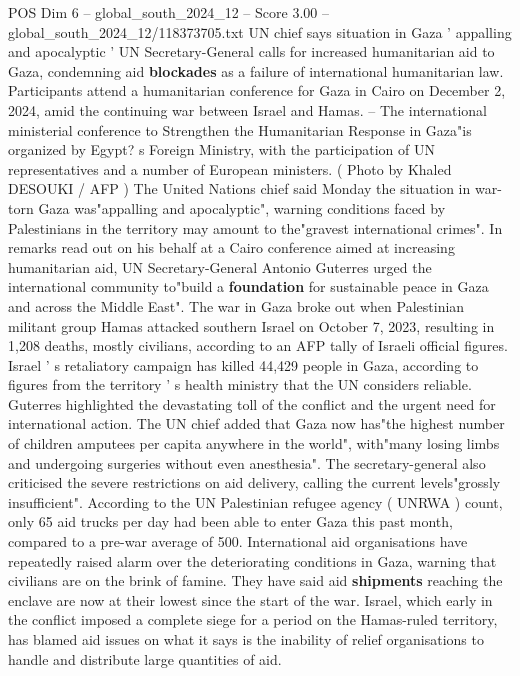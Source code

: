 \begin{textsample}{POS Dim 6 – global\_south\_2024\_12 – Score 3.00 – global\_south\_2024\_12/118373705.txt}  \label{ex:f6_pos_435}
UN chief says situation in Gaza ' appalling and apocalyptic ' UN Secretary-General calls for increased humanitarian aid to Gaza, condemning aid \textbf{blockades} as a failure of international humanitarian law.
Participants attend a humanitarian conference for Gaza in Cairo on December 2, 2024, amid the continuing war between Israel and Hamas. -- The international ministerial conference to Strengthen the Humanitarian Response in Gaza"is organized by Egypt? s Foreign Ministry, with the participation of UN representatives and a number of European ministers. ( Photo by Khaled DESOUKI / AFP ) The United Nations chief said Monday the situation in war-torn Gaza was"appalling and apocalyptic", warning conditions faced by Palestinians in the territory may amount to the"gravest international crimes".
In remarks read out on his behalf at a Cairo conference aimed at increasing humanitarian aid, UN Secretary-General Antonio Guterres urged the international community to"build a \textbf{foundation} for sustainable peace in Gaza and across the Middle East".
The war in Gaza broke out when Palestinian militant group Hamas attacked southern Israel on October 7, 2023, resulting in 1,208 deaths, mostly civilians, according to an AFP tally of Israeli official figures.
Israel ' s retaliatory campaign has killed 44,429 people in Gaza, according to figures from the territory ' s health ministry that the UN considers reliable.
Guterres highlighted the devastating toll of the conflict and the urgent need for international action.
The UN chief added that Gaza now has"the highest number of children amputees per capita anywhere in the world", with"many losing limbs and undergoing surgeries without even anesthesia".
The secretary-general also criticised the severe restrictions on aid delivery, calling the current levels"grossly insufficient".
According to the UN Palestinian refugee agency ( UNRWA ) count, only 65 aid trucks per day had been able to enter Gaza this past month, compared to a pre-war average of 500.
International aid organisations have repeatedly raised alarm over the deteriorating conditions in Gaza, warning that civilians are on the brink of famine.
They have said aid \textbf{shipments} reaching the enclave are now at their lowest since the start of the war.
Israel, which early in the conflict imposed a complete siege for a period on the Hamas-ruled territory, has blamed aid issues on what it says is the inability of relief organisations to handle and distribute large quantities of aid.

\end{textsample}
